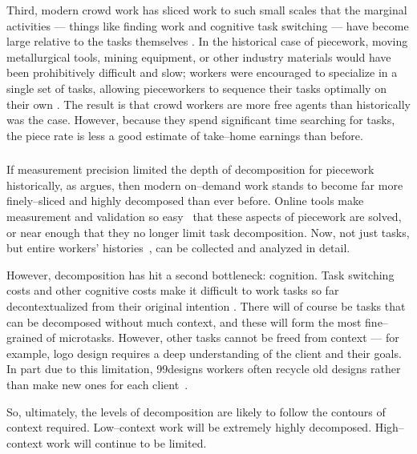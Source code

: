 \documentclass[trackingWork]{subfiles}
\begin{document}
Third, modern crowd work has sliced work to such small scales that the marginal activities
--- things like finding work and cognitive task switching ---
have become large relative to the tasks themselves
\cite{taskSearch}.
In the historical case of piecework,
moving metallurgical tools, mining equipment, or
other industry materials would have been prohibitively difficult and slow;
workers were encouraged to specialize in a single set of tasks,
allowing pieceworkers to sequence their tasks optimally on their own
\cite{hart2013rise}.
The result is that crowd workers are more free agents than historically was the case.
However, because they spend significant time searching for tasks, the piece rate is less a good estimate of take--home earnings than before.


\subsubsection{\implication}
If measurement precision limited the depth of decomposition for piecework historically, as \citeauthor{10.2307/23702539} argues, then modern on--demand work stands to become far more finely--sliced and highly decomposed than ever before.
Online tools make measurement and validation so easy~\cite{rzeszotarski2011instrumenting} that these aspects of piecework are solved, or near enough that they no longer limit task decomposition.
Now, not just tasks, but entire workers' histories~\cite{hata2017glimpse}, can be collected and analyzed in detail.

However, decomposition has hit a second bottleneck: cognition. 
Task switching costs and other cognitive costs make it difficult to work tasks so far decontextualized from their original intention \cite{delayAndOrderLasecki}.
There will of course be tasks that can be decomposed without much context, and these will form the most fine--grained of microtasks.
However, other tasks cannot be freed from context --- for example, logo design requires a deep understanding of the client and their goals.
In part due to this limitation, 99designs workers often recycle old designs rather than make new ones for each client~\cite{araujo201399designs}.

So, ultimately, the levels of decomposition are likely to follow the contours of context required. Low--context work will be extremely highly decomposed. High--context work will continue to be limited.


\end{document}
